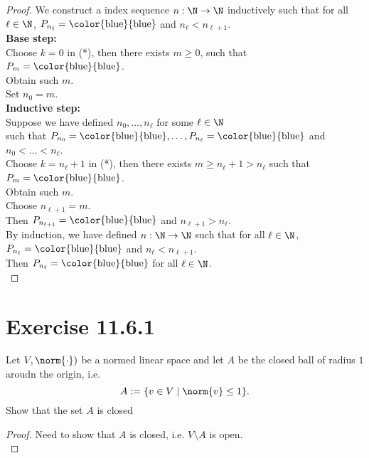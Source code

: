 \documentclass{article}
\newcommand{\blue}{\text{\color{blue}{blue}}}
\begin{document}
    \begin{proof}
        We construct a index sequence $n: \N \to \N$ inductively such that for all $\ell \in \N$, $P_{n_\ell} = \blue$ and $n_\ell < n_{\ell+1}$.\\

        \noindent\textbf{Base step:} \\
        Choose $k = 0$ in (*), then there exists $m \ge 0$, such that $P_m = \blue$. \\
        Obtain such $m$. \\
        Set $n_0 = m$. \\

        \noindent\textbf{Inductive step:} \\
        Suppose we have defined $n_0,\dots,n_\ell$ for some $\ell \in \N$ \\
        such that $P_{n_0} = \blue,\dots,P_{n_\ell} = \blue$ and $n_0 < \dots < n_\ell$. \\
        Choose $k = n_\ell + 1$ in (*), then there exists $m \ge n_\ell + 1 > n_\ell$ such that $P_m = \blue$. \\
        Obtain such $m$. \\
        Choose $n_{\ell+1} = m$. \\
        Then $P_{n_{\ell+1}} = \blue$ and $n_{\ell+1} > n_\ell$. \\

        By induction, we have defined $n: \N \to \N$ such that for all $\ell \in \N$, $P_{n_\ell} = \blue$ and $n_\ell < n_{\ell+1}$. \\
        Then $P_{n_\ell} = \blue$ for all $\ell \in \N$. \\
    \end{proof}

    \section{Exercise 11.6.1}
    \begin{problem}
        Let $V, \norm{\cdot})$ be a normed linear space and let $A$ be the closed ball of radius $1$ aroudn the origin, i.e.
        $$A:=\{v \in V \mid \norm{v} \le 1\}.$$
        Show that the set $A$ is closed
    \end{problem}
    \begin{proof}
        Need to show that $A$ is closed, i.e. $V \setminus A$ is open. \\
    \end{proof}
\end{document}
